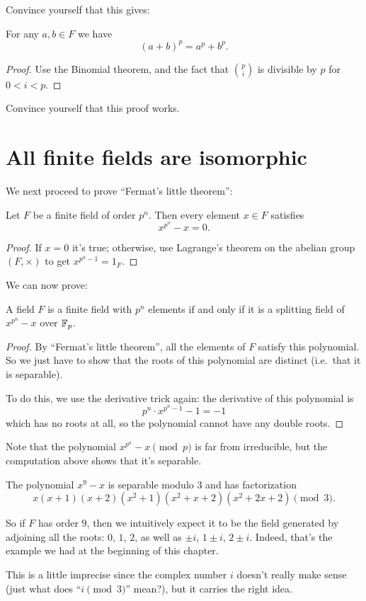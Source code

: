 Convince yourself that this gives:
\begin{theorem}
	For any $a,b \in F$ we have
	\[ (a+b)^p = a^p + b^p. \]
\end{theorem}
\begin{proof}
	Use the Binomial theorem, and the fact that $\binom pi$ is divisible by $p$ for $0 < i < p$.
\end{proof}
\begin{exercise}
	Convince yourself that this proof works.
\end{exercise}

\section{All finite fields are isomorphic}
We next proceed to prove ``Fermat's little theorem'':
\begin{theorem}
	Let $F$ be a finite field of order $p^n$.
	Then every element $x \in F$ satisfies
	\[ x^{p^n} - x = 0. \]
\end{theorem}
\begin{proof}
	If $x = 0$ it's true; otherwise, use Lagrange's theorem
	on the abelian group $(F, \times)$ to get $x^{p^n-1} = 1_F$.
\end{proof}

We can now prove:
\begin{theorem}
	A field $F$ is a finite field with $p^n$ elements if and only if
	it is a splitting field of $x^{p^n}-x$ over $\mathbb F_p$.
\end{theorem}
\begin{proof}
	By ``Fermat's little theorem'', all the elements of $F$ satisfy this polynomial.
	So we just have to show that the roots of this polynomial are distinct
	(i.e.\ that it is separable).

	To do this, we use the derivative trick again: the derivative of this polynomial is
	\[ p^n \cdot x^{p^n-1} - 1  = -1 \]
	which has no roots at all, so the polynomial cannot have any double roots. \qedhere
\end{proof}

Note that the polynomial $x^{p^n}-x \pmod p$ is far from irreducible, but
the computation above shows that it's separable.
\begin{example}
	The polynomial $x^9-x$ is separable modulo $3$ and has factorization
	\[ x(x+1)(x+2)(x^2+1)(x^2+x+2)(x^2+2x+2) \pmod 3. \]

	So if $F$ has order $9$, then we intuitively expect it to be the field
	generated by adjoining all the roots: $0$, $1$, $2$, as well as
	$\pm i$, $1 \pm i$, $2 \pm i$.
	Indeed, that's the example we had at the beginning of this chapter.

	This is a little imprecise since the complex number $i$ doesn't really make sense
	(just what does ``$i \pmod 3$'' mean?), but it carries the right idea.
\end{example}


